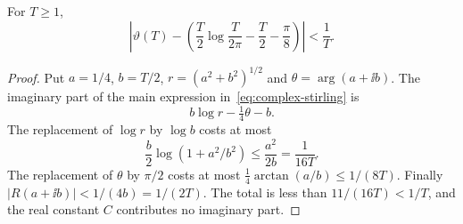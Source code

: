 \begin{lemma}
For $T\ge1$,
\begin{equation}
 \left|\vartheta(T)-
 \left(\frac T2\log\frac{T}{2\pi}-\frac T2-\frac\pi8\right)\right|
 <\frac1T.
 \label{eq:theta-bound}
\end{equation}
\end{lemma}

\begin{proof}
Put $a=1/4$, $b=T/2$, $r=(a^2+b^2)^{1/2}$ and
$\theta=\arg(a+\ii b)$. The imaginary part of the main expression
in~\eqref{eq:complex-stirling} is
\[
 b\log r-\tfrac14\theta-b.
\]
The replacement of $\log r$ by $\log b$ costs at most
\[
 \frac b2\log(1+a^2/b^2)\le\frac{a^2}{2b}=\frac1{16T}.
\]
The replacement of $\theta$ by $\pi/2$ costs at most
$\tfrac14\arctan(a/b)\le1/(8T)$. Finally
$|R(a+\ii b)|<1/(4b)=1/(2T)$. The total is less than
$11/(16T)<1/T$, and the real constant $C$ contributes no imaginary
part.
\end{proof}
